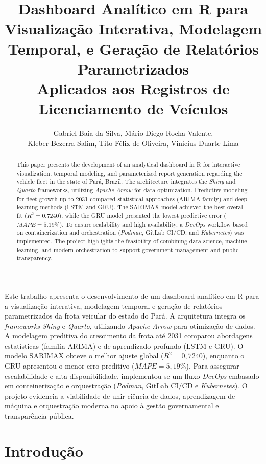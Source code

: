 \documentclass[12pt]{article}
\title{Dashboard Analítico em R para Visualização Interativa, Modelagem Temporal, e Geração de Relatórios Parametrizados \\ Aplicados aos Registros de Licenciamento de Veículos}
\author{Gabriel Baia da Silva\inst{1}, Mário Diego Rocha Valente\inst{1},\\
Kleber Bezerra Salim\inst{1}, Tito Félix de Oliveira\inst{1}, Vinicius Duarte Lima\inst{2}}
\begin{document}
 

\maketitle

\begin{abstract}
This paper presents the development of an analytical dashboard in R for interactive visualization, temporal modeling, and parameterized report generation regarding the vehicle fleet in the state of Pará, Brazil. The architecture integrates the \textit{Shiny} and \textit{Quarto} frameworks, utilizing \textit{Apache Arrow} for data optimization. Predictive modeling for fleet growth up to 2031 compared statistical approaches (ARIMA family) and deep learning methods (LSTM and GRU). The SARIMAX model achieved the best overall fit ($R^2 = 0.7240$), while the GRU model presented the lowest predictive error ($MAPE = 5.19\%$). To ensure scalability and high availability, a \textit{DevOps} workflow based on containerization and orchestration (\textit{Podman}, GitLab CI/CD, and \textit{Kubernetes}) was implemented. The project highlights the feasibility of combining data science, machine learning, and modern orchestration to support government management and public transparency.
\end{abstract}
     
\begin{resumo}
Este trabalho apresenta o desenvolvimento de um dashboard analítico em R para a visualização interativa, modelagem temporal e geração de relatórios parametrizados da frota veicular do estado do Pará. A arquitetura integra os \textit{frameworks Shiny} e \textit{Quarto}, utilizando \textit{Apache Arrow} para otimização de dados. A modelagem preditiva do crescimento da frota até 2031 comparou abordagens estatísticas (família ARIMA) e de aprendizado profundo (LSTM e GRU). O modelo SARIMAX obteve o melhor ajuste global ($R^2 = 0,7240$), enquanto o GRU apresentou o menor erro preditivo ($MAPE = 5,19\%$). Para assegurar escalabilidade e alta disponibilidade, implementou-se um fluxo \textit{DevOps} embasado em conteinerização e orquestração (\textit{Podman}, GitLab CI/CD e \textit{Kubernetes}). O projeto evidencia a viabilidade de unir ciência de dados, aprendizagem de máquina e orquestração moderna no apoio à gestão governamental e transparência pública.
\end{resumo}

\newpage

\section{Introdução}
\end{document}
